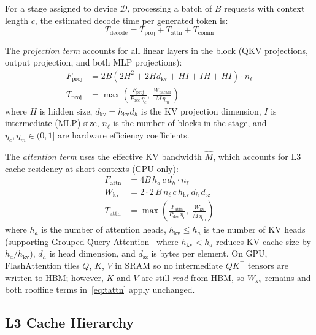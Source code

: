 \documentclass[lettersize,journal]{IEEEtran}
\begin{document}
For a stage assigned to device $\mathcal{D}$, processing a batch of $B$
requests with context length $c$, the estimated decode time per generated
token is:
\begin{equation}
  T_\text{decode} = T_\text{proj} + T_\text{attn} + T_\text{comm}
  \label{eq:decode}
\end{equation}

The \emph{projection term} accounts for all linear layers in the block (QKV
projections, output projection, and both MLP projections):
\begin{align}
  F_\text{proj} &= 2B\!\left(2H^2 + 2H d_\text{kv} + H I + I H + H I\right) \cdot n_\ell
  \label{eq:fprojdec}\\
  T_\text{proj} &= \max\!\left(\frac{F_\text{proj}}{P_\text{dec}\,\eta_c},\
                               \frac{W_\text{param}}{M\,\eta_m}\right)
  \label{eq:tproj}
\end{align}
where $H$ is hidden size, $d_\text{kv} = h_\text{kv} d_h$ is the KV
projection dimension, $I$ is intermediate (MLP) size, $n_\ell$ is the
number of blocks in the stage, and $\eta_c, \eta_m \in (0,1]$ are hardware
efficiency coefficients.

The \emph{attention term} uses the effective KV bandwidth $\hat{M}$, which
accounts for L3 cache residency at short contexts (CPU only):
\begin{align}
  F_\text{attn} &= 4B\,h_a\,c\,d_h \cdot n_\ell
  \label{eq:fattndec}\\
  W_\text{kv}  &= 2 \cdot 2\,B\,n_\ell\,c\,h_\text{kv}\,d_h\,d_\text{sz}
  \label{eq:wkv}\\
  T_\text{attn} &= \max\!\left(\frac{F_\text{attn}}{P_\text{dec}\,\eta_c},\
                               \frac{W_\text{kv}}{\hat{M}\,\eta_m}\right)
  \label{eq:tattn}
\end{align}
where $h_a$ is the number of attention heads, $h_\text{kv} \leq h_a$ is the
number of KV heads (supporting Grouped-Query Attention~\cite{gqa} where
$h_\text{kv} < h_a$ reduces KV cache size by $h_a / h_\text{kv}$), $d_h$
is head dimension, and $d_\text{sz}$ is bytes per element.
On GPU, FlashAttention tiles $Q$, $K$, $V$ in SRAM so no intermediate
$QK^\top$ tensors are written to HBM; however, $K$ and $V$ are still
\emph{read} from HBM, so $W_\text{kv}$ remains and both roofline terms
in~\eqref{eq:tattn} apply unchanged.

\subsection{L3 Cache Hierarchy}
\end{document}
